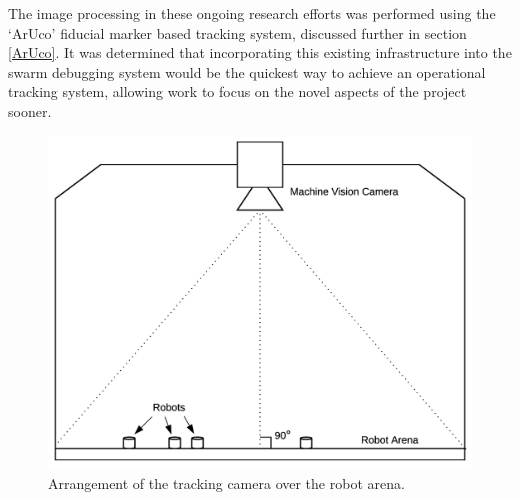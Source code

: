 The image processing in these ongoing research efforts was performed using the `ArUco\cite{Garrido:2014}' fiducial marker based tracking system, discussed further in section \ref{ArUco}. It was determined that incorporating this existing infrastructure into the swarm debugging system would be the quickest way to achieve an operational tracking system, allowing work to focus on the novel aspects of the project sooner.

\begin{figure}
	\centering
	\includegraphics[scale=0.3]{Figures/CameraLayout.png}
	\decoRule
	\caption[Tracking Camera Arrangement]{Arrangement of the tracking camera over the robot arena.}
	\label{fig:CameraLayout}
\end{figure}


